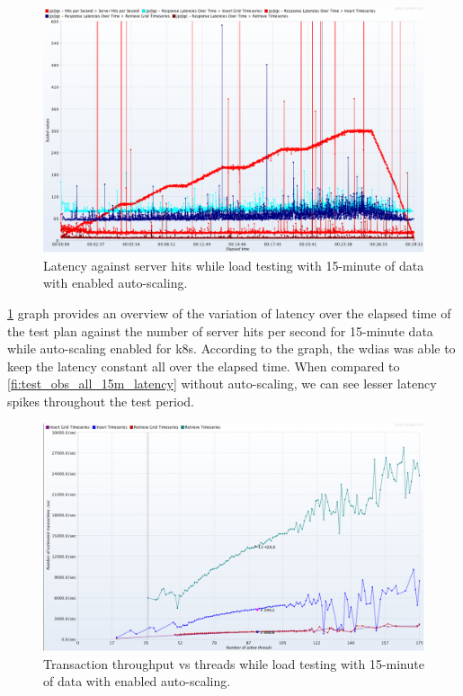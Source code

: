 \begin{figure}[htp]
    \centering
    \includegraphics[width=1.0\textwidth]{results/obs/all_auto/obs_all_auto_15m_res_latencies_against_hits.png}
    \caption{Latency against server hits while load testing with 15-minute of data with enabled auto-scaling.}
    \label{fi:test_obs_all_auto_15m_latency}
\end{figure}
\cref{fi:test_obs_all_auto_15m_latency} graph provides an overview of the variation of latency over the elapsed time of the test plan against the number of server hits per second for 15-minute data while auto-scaling enabled for \acrshort{k8s}. According to the graph, the \acrshort{wdias} was able to keep the latency constant all over the elapsed time.
When compared to \cref{fi:test_obs_all_15m_latency} without auto-scaling, we can see lesser latency spikes throughout the test period.

\begin{figure}[htp]
    \centering
    \includegraphics[width=1.0\textwidth]{results/obs/all_auto/obs_all_auto_15m_transaction_throughtput_vs_threads.png}
    \caption{Transaction throughput vs threads while load testing with 15-minute of data with enabled auto-scaling.}
    \label{fi:test_obs_all_auto_15m_throughtput}
\end{figure}

